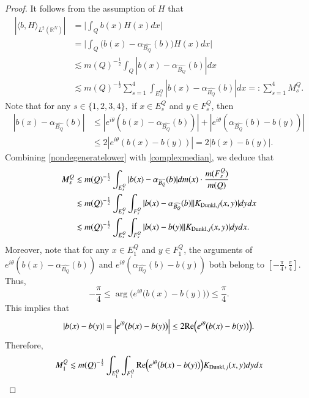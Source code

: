 \documentclass[12pt]{amsart}
\begin{document}
\begin{proof}
It follows from the assumption of $H$ that
\begin{align*}
  |\langle b,H\rangle_{L^2(\mathbb{R}^N)}|
  &=\Bigg|\int_Q b(x)H(x)dx\Bigg|\nonumber\\
  &=\Bigg|\int_Q\big(b(x)-\alpha_{\widehat{B_Q}}(b)\big)H(x)dx\Bigg|\nonumber\\
  &\lesssim m(Q)^{-\frac{1}{2}}\int_Q|b(x)-\alpha_{\widehat{B_Q}}(b)|dx\nonumber\\
  &\lesssim m(Q)^{-\frac{1}{2}}\sum_{s=1}^4\int_{E_s^Q}|b(x)-\alpha_{\widehat{B_Q}}(b)|dx=:\sum_{s=1}^4 M_s^Q.
\end{align*}
Note that for any $s\in\{1,2,3,4\},$ if $x\in E_s^Q$ and $y\in F_s^Q$, then
\begin{align}\label{complexmedian}
  |b(x)-\alpha_{\widehat{B_Q}}(b)|&\leq |e^{i\theta}(b(x)-\alpha_{\widehat{B_Q}}(b))|+|e^{i\theta}(\alpha_{\widehat{B_Q}}(b)-b(y))|\nonumber\\
  &\leq 2|e^{i\theta}(b(x)-b(y))|=2|b(x)-b(y)|.
\end{align}
Combining \eqref{nondegeneratelower} with \eqref{complexmedian}, we deduce that
\begin{align}
  M_s^Q&\lesssim m(Q)^{-\frac{1}{2}}\int_{E_s^Q}|b(x)-\alpha_{\widehat{B_Q}}(b)|dm(x)\cdot \frac{m(F_s^Q)}{m(Q)}\nonumber\\
  &\lesssim m(Q)^{-\frac{1}{2}}\int_{E_s^Q}\int_{F_s^Q}|b(x)-\alpha_{\widehat{B_Q}}(b)||K_{{\rm Dunkl},j}(x,y)|dydx\nonumber\\
  &\lesssim m(Q)^{-\frac{1}{2}}\int_{E_s^Q}\int_{F_s^Q}|b(x)-b(y)||K_{{\rm Dunkl},j}(x,y)|dydx.
\end{align}
Moreover, note that for any $x\in E_1^Q$ and $y\in F_1^Q$, the arguments of $e^{i\theta}(b(x)-\alpha_{\widehat{B_Q}}(b))$ and $e^{i\theta}(\alpha_{\widehat{B_Q}}(b)-b(y))$ both belong to $[-\frac{\pi}{4},\frac{\pi}{4}]$. Thus,
$$-\frac{\pi}{4}\leq \arg\Big(e^{i\theta}\big(b(x)-b(y)\big)\Big)\leq \frac{\pi}{4}.$$
This implies that
\begin{align}
  |b(x)-b(y)|=\Big|e^{i\theta}\big(b(x)-b(y)\big)\Big|\leq 2{\rm Re}\Big(e^{i\theta}\big(b(x)-b(y)\big)\Big).
\end{align}
Therefore,
\begin{align*}
  M_1^Q
  &\lesssim m(Q)^{-\frac{1}{2}}\int_{E_1^Q}\int_{F_1^Q}{\rm Re}\Big(e^{i\theta}\big(b(x)-b(y)\big)\Big)K_{\D,j}(x,y)dydx\nonumber\\

\end{align*}
\end{proof}
\end{document}
